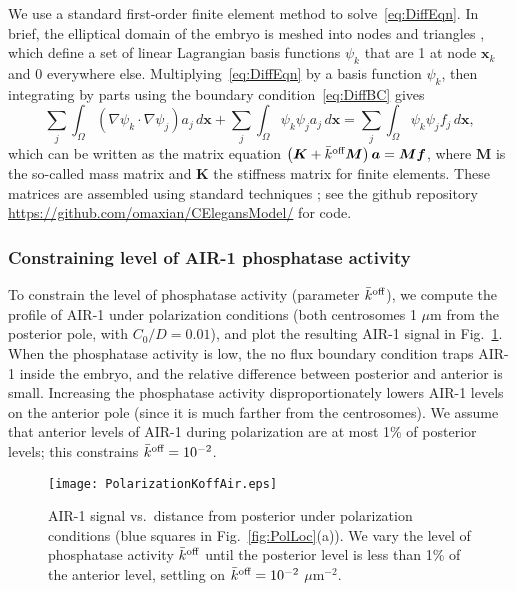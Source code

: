 \documentclass[11pt]{article}
\newcommand{\V}[1]{\boldsymbol{#1}}                 %
\newcommand{\M}[1]{\boldsymbol{#1}}
\begin{document}
\begin{appendix}
We use a standard first-order finite element method to solve\ \eqref{eq:DiffEqn}. In brief, the elliptical domain of the embryo is meshed into nodes and triangles \citep{persson2004simple}, which define a set of linear Lagrangian basis functions $\psi_k$ that are 1 at node $\V{x}_k$ and 0 everywhere else. Multiplying\ \eqref{eq:DiffEqn} by a basis function $\psi_k$, then integrating by parts using the boundary condition\ \eqref{eq:DiffBC} gives 
\begin{equation}
\sum_j \int_{\Omega} \left(\nabla \psi_k \cdot \nabla \psi_j\right) a_j \, d\V{x}+\sum_j \int_{\Omega} \psi_k \psi_j a_j \, d\V{x}= \sum_j \int_{\Omega} \psi_k \psi_j f_j \, d\V{x},
\end{equation}
which can be written as the matrix equation $\left(\M K + \koffb \M M \right) \V a = \M M \V f$, where $\M{M}$ is the so-called mass matrix and $\M{K}$ the stiffness matrix for finite elements. These matrices are assembled using standard techniques \citep[c.~7]{gockenbach2006understanding}; see the github repository \url{https://github.com/omaxian/CElegansModel/} for code.

\subsubsection{Constraining level of AIR-1 phosphatase activity}
To constrain the level of phosphatase activity (parameter $\bar{k}^\text{off}$), we compute the profile of AIR-1 under polarization conditions (both centrosomes 1 $\mu$m from the posterior pole, with $C_0/D=0.01$), and plot the resulting AIR-1 signal in Fig.\ \ref{fig:AIR1ProfKoff}. When the phosphatase activity is low, the no flux boundary condition traps AIR-1 inside the embryo, and the relative difference between posterior and anterior is small. Increasing the phosphatase activity disproportionately lowers AIR-1 levels on the anterior pole (since it is much farther from the centrosomes). We assume that anterior levels of AIR-1 during polarization are at most 1\% of posterior levels; this constrains $\bar{k}^\text{off}=10^{-2}$. 

\begin{figure}
\centering
\texttt{[image: PolarizationKoffAir.eps]}
\caption{\label{fig:AIR1ProfKoff}AIR-1 signal vs.\ distance from posterior under polarization conditions (blue squares in Fig.\ \ref{fig:PolLoc}(a)). We vary the level of phosphatase activity $\bar{k}^\text{off}$ until the posterior level is less than 1\% of the anterior level, settling on $\bar{k}^\text{off}=10^{-2}$ $\mu$m$^{-2}$.}
\end{figure}



\end{appendix}
\end{document}
